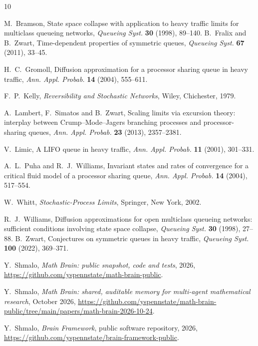 \documentclass[11pt]{amsart}
\theoremstyle{remark}
\numberwithin{equation}{section}
\newcommand{\1}{\mathbf 1}
\begin{document}
\begin{thebibliography}{10}

M.~Bramson, State space collapse with application to heavy traffic limits for multiclass queueing networks, \emph{Queueing Syst.} \textbf{30} (1998), 89--140.
B.~Fralix and B.~Zwart, Time-dependent properties of symmetric queues, \emph{Queueing Syst.} \textbf{67} (2011), 33--45.

H.~C.~Gromoll, Diffusion approximation for a processor sharing queue in heavy traffic, \emph{Ann. Appl. Probab.} \textbf{14} (2004), 555--611.

F.~P.~Kelly, \emph{Reversibility and Stochastic Networks}, Wiley, Chichester, 1979.

A.~Lambert, F.~Simatos and B.~Zwart, Scaling limits via excursion theory: interplay between Crump--Mode--Jagers branching processes and processor-sharing queues, \emph{Ann. Appl. Probab.} \textbf{23} (2013), 2357--2381.

V.~Limic, A LIFO queue in heavy traffic, \emph{Ann. Appl. Probab.} \textbf{11} (2001), 301--331.

A.~L.~Puha and R.~J.~Williams, Invariant states and rates of convergence for a critical fluid model of a processor sharing queue, \emph{Ann. Appl. Probab.} \textbf{14} (2004), 517--554.

W.~Whitt, \emph{Stochastic-Process Limits}, Springer, New York, 2002.

R.~J.~Williams, Diffusion approximations for open multiclass queueing networks: sufficient conditions involving state space collapse, \emph{Queueing Syst.} \textbf{30} (1998), 27--88.
B.~Zwart, Conjectures on symmetric queues in heavy traffic, \emph{Queueing Syst.} \textbf{100} (2022), 369--371.

 Y.~Shmalo, \emph{Math Brain: public snapshot, code and tests}, 2026, \url{https://github.com/yspennstate/math-brain-public}.

 Y.~Shmalo, \emph{Math Brain: shared, auditable memory for multi-agent mathematical research}, October 2026, \url{https://github.com/yspennstate/math-brain-public/tree/main/papers/math-brain-2026-10-24}.

 Y.~Shmalo, \emph{Brain Framework}, public software repository, 2026, \url{https://github.com/yspennstate/brain-framework-public}.

\end{thebibliography}
\end{document}

